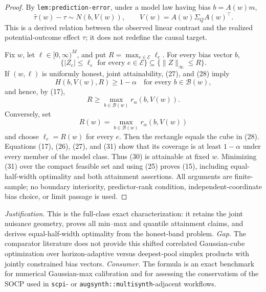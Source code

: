 \documentclass{article}
\begin{document}
\begin{proof}
By \texttt{lem:prediction-error}, under a model law having bias
\(b=A(w)m\),
\[
 \widehat\tau(w)-\tau\sim
 N\!\left(b,V(w)\right),
 \qquad V(w)=A(w)\Sigma_QA(w)^{\top}. \tag{27}
\]
This is a derived relation between the observed linear contrast and the
realized potential-outcome effect \(\tau\); it does not redefine the causal
target.

Fix \(w\), let \(\ell\in[0,\infty)^M\), and put
\(R=\max_{e\in\mathcal E}\ell_e\).  For every bias vector \(b\),
\[
 \{|Z_e|\leq\ell_e\text{ for every }e\in\mathcal E\}
 \subseteq\{\lVert Z\rVert_\infty\leq R\}. \tag{28}
\]
If \((w,\ell)\) is uniformly honest, joint attainability, (27), and (28)
imply
\[
 H(b,V(w),R)\geq1-\alpha
 \quad\text{for every }b\in\mathcal B(w), \tag{29}
\]
and hence, by (17),
\[
 R\geq\max_{b\in\mathcal B(w)}r_\alpha(b,V(w)). \tag{30}
\]
Conversely, set
\[
 R(w)=\max_{b\in\mathcal B(w)}r_\alpha(b,V(w)) \tag{31}
\]
and choose \(\ell_e=R(w)\) for every \(e\).  Then the rectangle equals the
cube in (28).  Equations (17), (26), (27), and (31) show that its coverage is
at least \(1-\alpha\) under every member of the model class.  Thus (30) is
attainable at fixed \(w\).  Minimizing (31) over the compact feasible set and
using (25) proves (15), including equal-half-width optimality and both
attainment assertions.  All arguments are finite-sample; no boundary
interiority, predictor-rank condition, independent-coordinate bias choice, or
limit passage is used.
\end{proof}
\par\smallskip\noindent \textit{Justification.} This is the full-class exact characterization: it retains the joint nuisance geometry, proves all min--max and quantile attainment claims, and derives equal-half-width optimality from the honest-band problem. \textit{Gap.} The comparator literature does not provide this shifted correlated Gaussian-cube optimization over horizon-adaptive versus deepest-pool simplex products with jointly constrained bias vectors. \textit{Consumer.} The formula is an exact benchmark for numerical Gaussian-max calibration and for assessing the conservatism of the SOCP used in \texttt{scpi}- or \texttt{augsynth::multisynth}-adjacent workflows.
\end{document}
